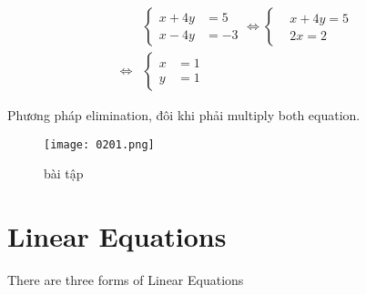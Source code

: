 \[
  \begin{aligned}
    &\left\{\begin{aligned} 
      x + 4y &= 5 \\ 
      x - 4y &= -3
    \end{aligned}\right. \iff 
    \left\{\begin{aligned}
      &x +4y = 5\\ 
      &2x = 2
    \end{aligned}\right.
    \\
    \iff &\left\{\begin{aligned} 
      x &= 1 \\ 
      y &= 1
    \end{aligned}\right.
  \end{aligned}
\]

\newpage

Phương pháp elimination, đôi khi phải multiply both equation.

\begin{figure}[htb!]
  \centering
  \texttt{[image: 0201.png]}
  \caption{bài tập}
\end{figure}

\section{Linear Equations}

There are three forms of Linear Equations


